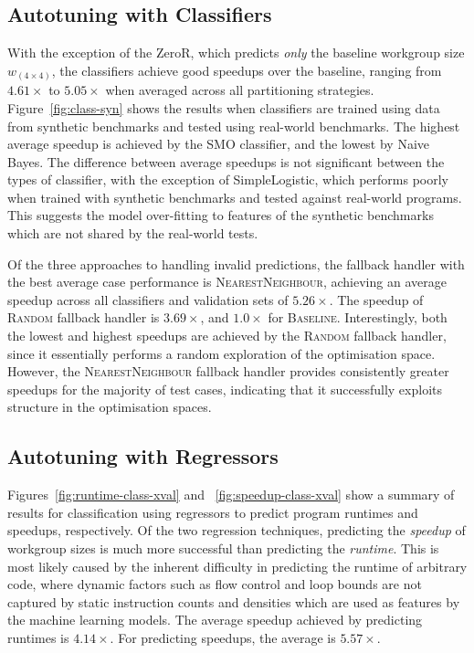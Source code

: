 \documentclass[nonatbib,preprint,10pt]{sigplanconf}
\begin{document}
\subsection{Autotuning with Classifiers}

With the exception of the ZeroR, which predicts \emph{only} the
baseline workgroup size $w_{\left( 4 \times 4 \right)}$, the
classifiers achieve good speedups over the baseline, ranging from
$4.61\times$ to $5.05\times$ when averaged across all partitioning
strategies. Figure~\ref{fig:class-syn} shows the results when
classifiers are trained using data from synthetic benchmarks and
tested using real-world benchmarks. The highest average speedup is
achieved by the SMO classifier, and the lowest by Naive Bayes. The
difference between average speedups is not significant between the
types of classifier, with the exception of SimpleLogistic, which
performs poorly when trained with synthetic benchmarks and tested
against real-world programs. This suggests the model over-fitting to
features of the synthetic benchmarks which are not shared by the
real-world tests.

Of the three approaches to handling invalid predictions, the fallback
handler with the best average case performance is
\textsc{NearestNeighbour}, achieving an average speedup across all
classifiers and validation sets of $5.26\times$. The speedup of
\textsc{Random} fallback handler is $3.69\times$, and $1.0\times$ for
\textsc{Baseline}. Interestingly, both the lowest and highest speedups
are achieved by the \textsc{Random} fallback handler, since it
essentially performs a random exploration of the optimisation
space. However, the \textsc{NearestNeighbour} fallback handler
provides consistently greater speedups for the majority of test cases,
indicating that it successfully exploits structure in the optimisation
spaces.


\subsection{Autotuning with Regressors}

Figures~\ref{fig:runtime-class-xval} and ~\ref{fig:speedup-class-xval}
show a summary of results for classification using regressors to
predict program runtimes and speedups, respectively. Of the two
regression techniques, predicting the \emph{speedup} of workgroup
sizes is much more successful than predicting the \emph{runtime}. This
is most likely caused by the inherent difficulty in predicting the
runtime of arbitrary code, where dynamic factors such as flow control
and loop bounds are not captured by static instruction counts and
densities which are used as features by the machine learning
models. The average speedup achieved by predicting runtimes is
$4.14\times$. For predicting speedups, the average is $5.57\times$.
\end{document}
